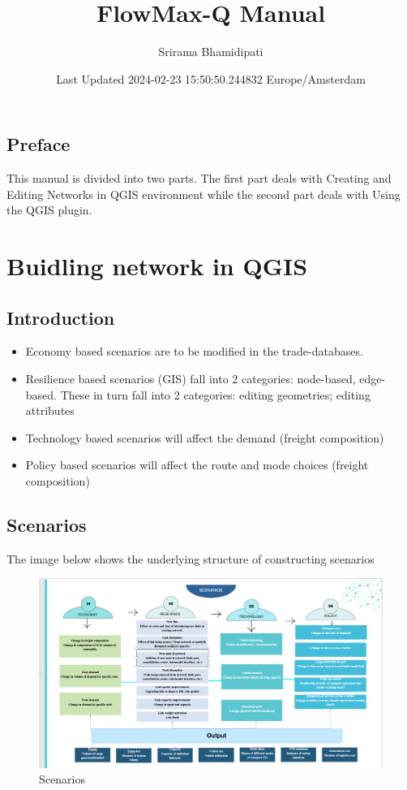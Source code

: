 \documentclass[
]{book}
\title{FlowMax-Q Manual}
\author{Srirama Bhamidipati}
\date{Last Updated 2024-02-23 15:50:50.244832 Europe/Amsterdam}
\providecommand{\tightlist}{%
  \setlength{\itemsep}{0pt}\setlength{\parskip}{0pt}}
\begin{document}
\maketitle

{
\setcounter{tocdepth}{1}
\tableofcontents
}
\hypertarget{preface}{%
\chapter{Preface}\label{preface}}

This manual is divided into two parts. The first part deals with Creating and Editing Networks in QGIS environment while the second part deals with Using the QGIS plugin.

\hypertarget{part-buidling-network-in-qgis}{%
\part{Buidling network in QGIS}\label{part-buidling-network-in-qgis}}

\hypertarget{introduction}{%
\chapter{Introduction}\label{introduction}}

\begin{itemize}
\tightlist
\item
  Economy based scenarios are to be modified in the trade-databases.
\item
  Resilience based scenarios (GIS) fall into 2 categories: node-based, edge-based. These in turn fall into 2 categories: editing geometries; editing attributes
\item
  Technology based scenarios will affect the demand (freight composition)
\item
  Policy based scenarios will affect the route and mode choices (freight composition)
\end{itemize}

\hypertarget{scenarios}{%
\chapter{Scenarios}\label{scenarios}}

The image below shows the underlying structure of constructing scenarios

\begin{figure}
\centering
\includegraphics{"./Picture1.png"}
\caption{Scenarios}
\end{figure}
\end{document}
